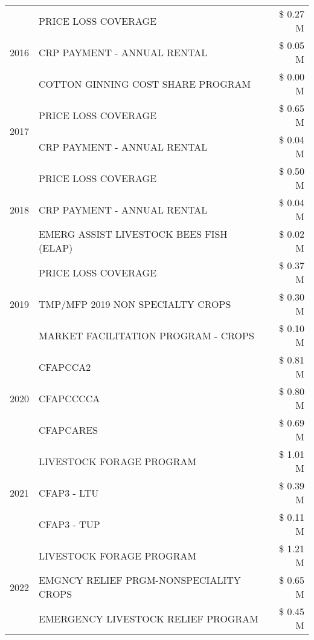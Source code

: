 \begin{tabular}{llr}
\multirow[t]{3}{*}{2016} & PRICE LOSS COVERAGE & \$ 0.27 M \\
 & CRP PAYMENT - ANNUAL RENTAL & \$ 0.05 M \\
 & COTTON GINNING COST SHARE PROGRAM & \$ 0.00 M \\
\cline{1-3}
\multirow[t]{2}{*}{2017} & PRICE LOSS COVERAGE & \$ 0.65 M \\
 & CRP PAYMENT - ANNUAL RENTAL & \$ 0.04 M \\
\cline{1-3}
\multirow[t]{3}{*}{2018} & PRICE LOSS COVERAGE & \$ 0.50 M \\
 & CRP PAYMENT - ANNUAL RENTAL & \$ 0.04 M \\
 & EMERG ASSIST LIVESTOCK BEES FISH (ELAP) & \$ 0.02 M \\
\cline{1-3}
\multirow[t]{3}{*}{2019} & PRICE LOSS COVERAGE & \$ 0.37 M \\
 & TMP/MFP 2019 NON SPECIALTY CROPS & \$ 0.30 M \\
 & MARKET FACILITATION PROGRAM - CROPS & \$ 0.10 M \\
\cline{1-3}
\multirow[t]{3}{*}{2020} & CFAPCCA2 & \$ 0.81 M \\
 & CFAPCCCCA & \$ 0.80 M \\
 & CFAPCARES & \$ 0.69 M \\
\cline{1-3}
\multirow[t]{3}{*}{2021} & LIVESTOCK FORAGE PROGRAM & \$ 1.01 M \\
 & CFAP3 - LTU & \$ 0.39 M \\
 & CFAP3 - TUP & \$ 0.11 M \\
\cline{1-3}
\multirow[t]{3}{*}{2022} & LIVESTOCK FORAGE PROGRAM & \$ 1.21 M \\
 & EMGNCY RELIEF PRGM-NONSPECIALITY CROPS & \$ 0.65 M \\
 & EMERGENCY LIVESTOCK RELIEF PROGRAM & \$ 0.45 M \\
\cline{1-3}
\bottomrule
\end{tabular}
